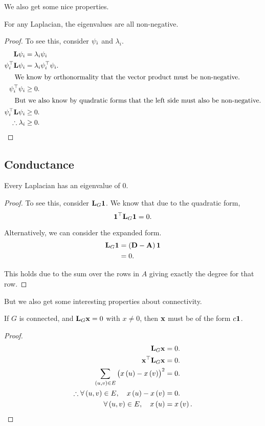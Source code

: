 \documentclass[11pt]{article}
\renewcommand\vec{\V}
\newcommand\itxt[1]{\intertext{\indent#1}}
\begin{document}
We also get some nice properties.
\begin{lemma}
For any Laplacian, the eigenvalues are all non-negative.
\end{lemma}
\begin{proof}
To see this, consider $\vec{\psi}_i$ and $\lambda_i$.
\begin{align*}
\V{L}\vec{\psi}_i&=\lambda_i\vec{\psi}_i\\
\vec{\psi}_i^{\top}\V{L}\vec{\psi}_i
&=\lambda_i\vec{\psi}_i^{\top}\vec{\psi}_i.\\
\itxt{We know by orthonormality that the vector product must be non-negative.}
\vec{\psi}_i^{\top}\vec{\psi}_i&\geq 0.\\
\itxt{But we also know by quadratic forms that the left side
must also be non-negative.}
\vec{\psi}_i^{\top}\V{L}\vec{\psi}_i&\geq 0.\\
\therefore\lambda_i&\geq 0.
\end{align*}
\end{proof}

\subsection{Conductance}
\begin{lemma}
Every Laplacian has an eigenvalue of $0$.
\end{lemma}
\begin{proof}
To see this, consider $\V{L}_{G}\vec{\V{1}}$.
We know that due to the quadratic form,
$$\vec{\V{1}}^{\top}\V{L}_{G}\vec{\V{1}}=0.$$

Alternatively, we can consider the expanded form.
\begin{align*}
\V{L}_{G}\vec{\V{1}}&=\paren{\V{D}-\V{A}}\vec{\V{1}}\\
&=0.\\
\end{align*}

This holds due to the sum over the rows in $A$
giving exactly the degree for that row.
\end{proof}

But we also get some interesting properties about connectivity.

\begin{lemma}
If $G$ is connected, and $\V{L}_{G}\vec{x}=0$ with $x\neq 0$,
then $\vec{x}$ must be of the form $c\vec{\V{1}}$.
\end{lemma}
\begin{proof}
\begin{align*}
\V{L}_{G}\vec{x}&=0.\\
\vec{x}^{\top}\V{L}_{G}\vec{x}&=0.\\
\sum\limits_{\paren{u,v}\in E}\paren{x\paren{u}-x\paren{v}}^2&=0.\\
\therefore\forall\paren{u,v}\in E,\quad x\paren{u}-x\paren{v}&=0.\\
\forall\paren{u,v}\in E,\quad x\paren{u}&=x\paren{v}.
\end{align*}
\end{proof}
\end{document}
